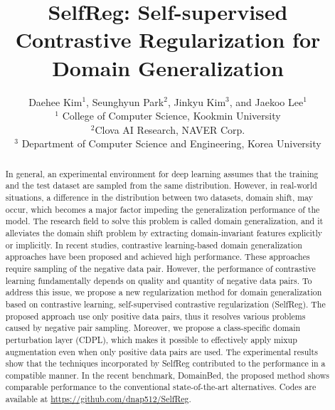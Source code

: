 \documentclass[10pt,twocolumn,letterpaper]{article}
\begin{document}
\title{SelfReg: Self-supervised Contrastive Regularization for Domain Generalization}

\author{Daehee Kim$^1$, Seunghyun Park$^2$, Jinkyu Kim$^3$, and Jaekoo Lee$^1$ \\
\small{$^1$ College of Computer Science, Kookmin University}\\
\small{$^2$Clova AI Research, NAVER Corp.} \\
\small{$^3$ Department of Computer Science and Engineering, Korea University}
}






\maketitle

\begin{abstract}
In general, an experimental environment for deep learning assumes that the training and the test dataset are sampled from the same distribution. However, in real-world situations, a difference in the distribution between two datasets, domain shift, may occur, which becomes a major factor impeding the generalization performance of the model. The research field to solve this problem is called domain generalization, and it alleviates the domain shift problem by extracting domain-invariant features explicitly or implicitly.
In recent studies, contrastive learning-based domain generalization approaches have been proposed and achieved high performance. These approaches require sampling of the negative data pair. However, the performance of contrastive learning fundamentally depends on quality and quantity of negative data pairs.
To address this issue, we propose a new regularization method for domain generalization based on contrastive learning, self-supervised contrastive regularization (SelfReg). The proposed approach use only positive data pairs, thus it resolves various problems caused by negative pair sampling. Moreover, we propose a class-specific domain perturbation layer (CDPL), which makes it possible to effectively apply mixup augmentation even when only positive data pairs are used.
The experimental results show that the techniques incorporated by SelfReg contributed to the performance in a compatible manner. In the recent benchmark, DomainBed, the proposed method shows comparable performance to the conventional state-of-the-art alternatives. 
Codes are available at \href{https://github.com/dnap512/SelfReg}{https://github.com/dnap512/SelfReg}.
\end{abstract}
\end{document}
